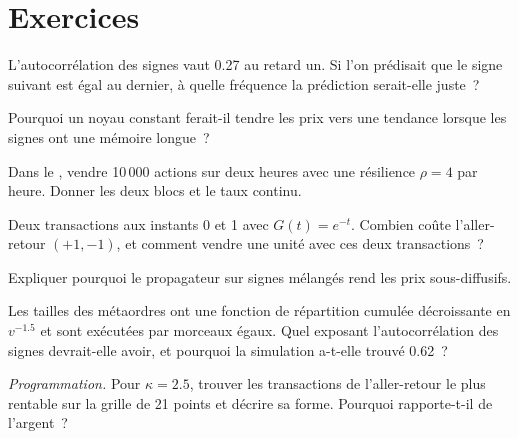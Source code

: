 \section{Exercices}

\begin{exercise}[$\star$]\label{exo:mx:transient-impact-and-propagator-models:1}
L'autocorrélation des signes vaut 0.27 au retard un. Si l'on prédisait que le signe suivant est égal au dernier, à quelle fréquence la prédiction serait-elle juste~?
\end{exercise}

\begin{exercise}[$\star$]\label{exo:mx:transient-impact-and-propagator-models:2}
Pourquoi un noyau constant ferait-il tendre les prix vers une tendance lorsque les signes ont une mémoire longue~?
\end{exercise}

\begin{exercise}[$\star$]\label{exo:mx:transient-impact-and-propagator-models:3}
Dans le , vendre 10\,000 actions sur deux heures avec une résilience $\rho=4$ par heure. Donner les deux blocs et le taux continu.
\end{exercise}

\begin{exercise}[$\star\star$]\label{exo:mx:transient-impact-and-propagator-models:4}
Deux transactions aux instants 0 et 1 avec $G(t)=e^{-t}$. Combien coûte l'aller-retour $(+1,-1)$, et comment vendre une unité avec ces deux transactions~?
\end{exercise}

\begin{exercise}[$\star\star$]\label{exo:mx:transient-impact-and-propagator-models:5}
Expliquer pourquoi le propagateur sur signes mélangés rend les prix sous-diffusifs.
\end{exercise}

\begin{exercise}[$\star\star$]\label{exo:mx:transient-impact-and-propagator-models:6}
Les tailles des métaordres ont une fonction de répartition cumulée décroissante en $v^{-1.5}$ et sont exécutées par morceaux égaux. Quel exposant l'autocorrélation des signes
devrait-elle avoir, et pourquoi la simulation a-t-elle trouvé 0.62~?
\end{exercise}

\begin{exercise}[$\star\star\star$]\label{exo:mx:transient-impact-and-propagator-models:7}
\emph{Programmation.} Pour $\kappa=2.5$, trouver les transactions de l'aller-retour le plus rentable sur la grille de 21 points et décrire sa forme. Pourquoi rapporte-t-il de l'argent~?
\end{exercise}

